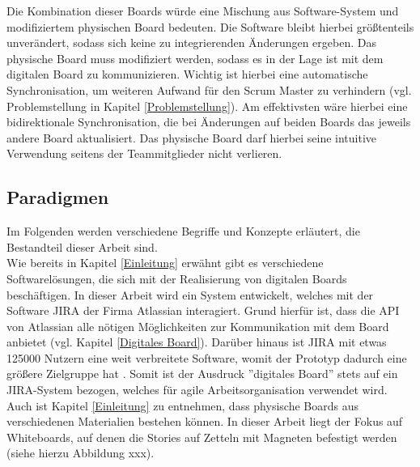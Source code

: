 \documentclass[12pt,titlepage]{scrartcl}
\begin{document}
		Die Kombination dieser Boards würde eine Mischung aus Software-System und modifiziertem physischen Board bedeuten. Die Software bleibt hierbei größtenteils unverändert, sodass sich keine zu integrierenden Änderungen ergeben. Das physische Board muss modifiziert werden, sodass es in der Lage ist mit dem digitalen Board zu kommunizieren. Wichtig ist hierbei eine automatische Synchronisation, um weiteren Aufwand für den Scrum Master zu verhindern (vgl. Problemstellung in Kapitel \ref{Problemstellung}). Am effektivsten wäre hierbei eine bidirektionale Synchronisation, die bei Änderungen auf beiden Boards das jeweils andere Board aktualisiert. Das physische Board darf hierbei seine intuitive Verwendung seitens der Teammitglieder nicht verlieren.
		\subsection{Paradigmen}
		Im Folgenden werden verschiedene Begriffe und Konzepte erläutert, die Bestandteil dieser Arbeit sind. \\
		Wie bereits in Kapitel \ref{Einleitung} erwähnt gibt es verschiedene Softwarelösungen, die sich mit der Realisierung von digitalen Boards beschäftigen. In dieser Arbeit wird ein System entwickelt, welches mit der Software JIRA der Firma Atlassian interagiert. Grund hierfür ist, dass die API von Atlassian alle nötigen Möglichkeiten zur Kommunikation mit dem Board anbietet (vgl. Kapitel \ref{Digitales Board}). Darüber hinaus ist JIRA mit etwas 125000 Nutzern eine weit verbreitete Software, womit der Prototyp dadurch eine größere Zielgruppe hat \cite{jirarevenue}. Somit ist der Ausdruck ''digitales Board'' stets auf ein JIRA-System bezogen, welches für agile Arbeitsorganisation verwendet wird. \\
		Auch ist Kapitel \ref{Einleitung} zu entnehmen, dass physische Boards aus verschiedenen Materialien bestehen können. In dieser Arbeit liegt der Fokus auf Whiteboards, auf denen die Stories auf Zetteln mit Magneten befestigt werden (siehe hierzu Abbildung xxx). 
\end{document}
